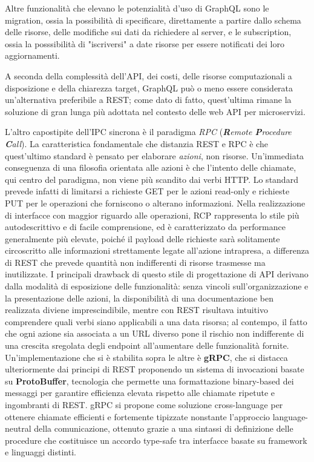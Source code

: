 Altre funzionalità che elevano le potenzialità d'uso di GraphQL sono le migration, ossia la possibilità di specificare, direttamente a partire dallo schema delle risorse, delle modifiche sui dati da richiedere al server, e le subscription, ossia la posssibilità di "iscriversi" a date risorse per essere notificati dei loro aggiornamenti.

A seconda della complessità dell'API, dei costi, delle risorse computazionali a disposizione e della chiarezza target, GraphQL può o meno essere considerata un'alternativa preferibile a REST; come dato di fatto, quest'ultima rimane la soluzione di gran lunga più adottata nel contesto delle web API per microservizi.

L'altro capostipite dell'IPC sincrona è il paradigma \emph{RPC} (\emph{\textbf{R}emote \textbf{P}rocedure \textbf{C}all}). La caratteristica fondamentale che distanzia REST e RPC è che quest'ultimo standard è pensato per elaborare \emph{azioni}, non risorse.
Un'immediata conseguenza di una filosofia orientata alle azioni è che l'intento delle chiamate, qui centro del paradigma, non viene più scandito dai verbi HTTP. Lo standard prevede infatti di limitarsi a richieste GET per le azioni read-only e richieste PUT per le operazioni che forniscono o alterano informazioni.
Nella realizzazione di interfacce con maggior riguardo alle operazioni, RCP rappresenta lo stile più autodescrittivo e di facile comprensione, ed è caratterizzato da performance generalmente più elevate, poiché il payload delle richieste sarà solitamente circoscritto alle informazioni strettamente legate all'azione intrapresa, a differenza di REST che prevede quantità non indifferenti di risorse trasmesse ma inutilizzate.
I principali drawback di questo stile di progettazione di API derivano dalla modalità di esposizione delle funzionalità: senza vincoli sull'organizzazione e la presentazione delle azioni, la disponibilità di una documentazione ben realizzata diviene imprescindibile, mentre con REST risultava intuitivo comprendere quali verbi siano applicabili a una data risorsa; al contempo, il fatto che ogni azione sia associata a un URL diverso pone il rischio non indifferente di una crescita sregolata degli endpoint all'aumentare delle funzionalità fornite. Un'implementazione che si è stabilita sopra le altre è \textbf{gRPC}, che si distacca ulteriormente dai principi di REST proponendo un sistema di invocazioni basate su \textbf{ProtoBuffer}, tecnologia che permette una formattazione binary-based dei messaggi per garantire efficienza elevata rispetto alle chiamate ripetute e ingombranti di REST.
gRPC si propone come soluzione cross-language per ottenere chiamate efficienti e fortemente tipizzate nonstante l'approccio language-neutral della comunicazione, ottenuto grazie a una sintassi di definizione delle procedure che costituisce un accordo type-safe tra interfacce basate su framework e linguaggi distinti.

